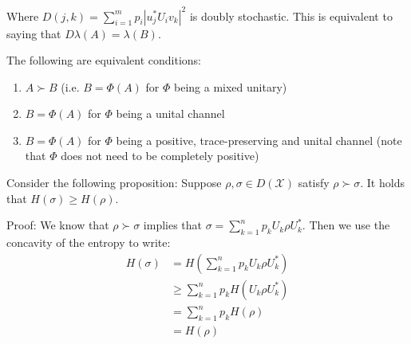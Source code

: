 \documentclass{article}
\begin{document}
    Where $D(j,k) = \sum\limits_{i=1}^m p_i|u_j^* U_i v_k|^2$ is doubly
    stochastic. This is equivalent to saying that $D \lambda(A) = \lambda(B)$.

    The following are equivalent conditions:
    \begin{enumerate}
        \item $A \succ B$ (i.e. $B = \Phi(A)$ for $\Phi$ being a mixed unitary)
        \item $B = \Phi(A)$ for $\Phi$ being a unital channel
        \item $B = \Phi(A)$ for $\Phi$ being a positive, trace-preserving and
            unital channel (note that $\Phi$ does not need to be completely
            positive)
    \end{enumerate}

    Consider the following proposition: Suppose $\rho,\sigma\in D(\mathcal{X})$
    satisfy $\rho \succ \sigma$. It holds that $H(\sigma) \ge H(\rho)$.

    Proof: We know that $\rho \succ \sigma$ implies that $\sigma = \sum_{k=1}^n
    p_k U_k \rho U_k^*$. Then we use the concavity of the entropy to write:
    \begin{align*}
        H(\sigma) &= H(\sum_{k=1}^n p_k U_k \rho U_k^*) \\
        &\ge \sum_{k=1}^n p_k H(U_k \rho U_k^*) \\
        &= \sum_{k=1}^n p_k H(\rho) \\
        &= H(\rho)
    \end{align*}
    
\end{document}
